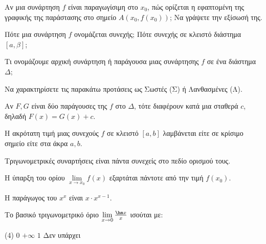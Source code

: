 \documentclass[11pt,a4paper]{article}
\newcommand{\kerkissans}[1]{{\fontfamily{maksf}\selectfont \textbf{#1}}}
\renewcommand{\textdexiakeraia}{}
\newcommand\themanum{A}
\newcounter{thema}[section]
\renewcommand{\thethema}{\arabic{thema}}
\newcommand{\Thema}{\refstepcounter{thema}{\textbf{\textcolor{black}{\faPenSquare\ \  \large \kerkissans{\textbf{\thethemaο\hspace{2mm}Διαγώνισμα - Θέμα \themanum}}}}}\hspace{0mm}}{}
\newenvironment{thema}[1]
{\begin{tcolorbox}[title=\Thema\kerkissans{\textbf{\large{  #1}}},breakable,
enhanced standard,titlerule=0pt,toprule=0pt, rightrule=0pt, bottomrule=0pt,
colback=white,left=0mm,top=1mm,bottom=0mm,
boxrule=0pt,
colframe=white,leftrule=0mm,sharp corners,coltitle=black]
\renewcommand{\themanum}{#1}}
{\end{tcolorbox}}
\begin{document}
\begin{thema}{A}
\begin{erwthma}
    \item Αν μια συνάρτηση $f$ είναι παραγωγίσιμη στο $x_0$, πώς ορίζεται η εφαπτομένη της γραφικής της παράστασης στο σημείο $A(x_0, f(x_0))$; Να γράψετε την εξίσωσή της.
    \item Πότε μια συνάρτηση $f$ ονομάζεται συνεχής; Πότε συνεχής σε κλειστό διάστημα $[a, \beta]$;
    \item Τι ονομάζουμε αρχική συνάρτηση ή παράγουσα μιας συνάρτησης $f$ σε ένα διάστημα $\Delta$;
    \item Να χαρακτηρίσετε τις παρακάτω προτάσεις ως Σωστές (Σ) ή Λανθασμένες (Λ).
    \begin{alist}
        \item Αν $F, G$ είναι δύο παράγουσες της $f$ στο $\Delta$, τότε διαφέρουν κατά μια σταθερά $c$, δηλαδή $F(x) = G(x) + c$.
        \item Η ακρότατη τιμή μιας συνεχούς $f$ σε κλειστό $[a,b]$ λαμβάνεται είτε σε κρίσιμο σημείο είτε στα άκρα $a, b$.
        \item Τριγωνομετρικές συναρτήσεις είναι πάντα συνεχείς στο πεδίο ορισμού τους.
        \item Η ύπαρξη του ορίου $\lim\limits_{x\to x_0} f(x)$ εξαρτάται πάντοτε από την τιμή $f(x_0)$.
        \item Η παράγωγος του $x^x$ είναι $x \cdot x^{x-1}$.
    \end{alist}
    \item Το βασικό τριγωνομετρικό όριο $\lim\limits_{x\to 0} \frac{\hm x}{x}$ ισούται με:
    \begin{tasks}[label=\let\textdexiakeraia\relax\alph*.](4)
        \task $0$
        \task $+\infty$
        \task $1$
        \task Δεν υπάρχει
    \end{tasks}
\end{erwthma}
\end{thema}
\vspace{1cm}
\end{document}
